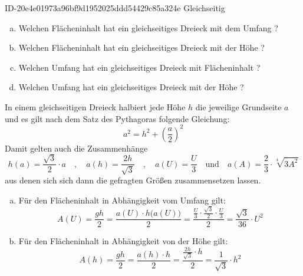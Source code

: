 \begin{exercise}
      {ID-20e4e01973a96bf9d1952025ddd54429c85a324e}
      {Gleichseitig}
  \ifproblem\problem
    \begin{enumerate}[a)]
      \item Welchen Flächeninhalt hat ein gleichseitiges Dreieck mit dem Umfang ?
      \item Welchen Flächeninhalt hat ein gleichseitiges Dreieck mit der Höhe ?
      \item Welchen Umfang hat ein gleichseitiges Dreieck mit Flächeninhalt ?
      \item Welchen Umfang hat ein gleichseitiges Dreieck mit der Höhe ?
    \end{enumerate}
  \fi
  \ifoutline\outline
    In einem gleichseitigen Dreieck halbiert jede Höhe $h$ die jeweilige
    Grundseite $a$ und es gilt nach dem Satz des Pythagoras folgende Gleichung:
    \begin{equation*}
      a^2=h^2+\left(\frac{a}{2}\right)^2
    \end{equation*}
    Damit gelten auch die Zusammenhänge
    \begin{equation*}
      h(a)=\frac{\sqrt{3}}{2}\cdot a
      \quad,\quad
      a(h)=\frac{2h}{\sqrt{3}}
      \quad,\quad
      a(U)=\frac{U}{3}
      \quad\text{und}\quad
      a(A)=\frac{2}{3}\cdot\sqrt[4]{3A^2}
    \end{equation*}
    aus denen sich sich dann die gefragten Größen zusammensetzen lassen.
    \begin{enumerate}[a)]
      \item Für den Flächeninhalt in Abhängigkeit vom Umfang gilt:
            \begin{equation*}
              A(U)
              =
              \frac{gh}{2}
              =
              \frac{a(U)\cdot h\big(a(U)\big)}{2}
              =
              \frac{\frac{U}{3}\cdot\frac{\sqrt{3}}{2}\cdot\frac{U}{3}}{2}
              =
              \frac{\sqrt{3}}{36}\cdot U^2
            \end{equation*}
      \item Für den Flächeninhalt in Abhängigkeit von der Höhe gilt:
            \begin{equation*}
              A(h)
              =
              \frac{gh}{2}
              =
              \frac{a(h)\cdot h}{2}
              =
              \frac{\frac{2h}{\sqrt{3}}\cdot h}{2}
              =
              \frac{1}{\sqrt{3}}\cdot h^2
            \end{equation*}

\end{enumerate}
\end{exercise}

